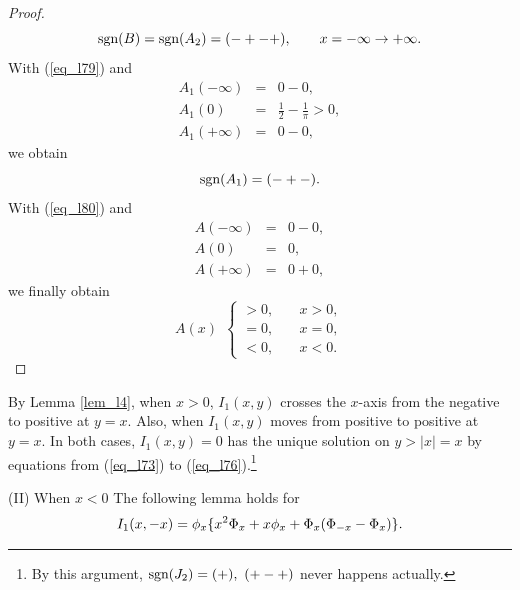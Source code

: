 \begin{proof}
\begin{equation}\label{eq_l79}
  \mbox{sgn}(B) = \mbox{sgn}(A_2) = (-+-+), \qquad x = -\infty \rightarrow +\infty.
\end{equation}
With (\ref{eq_l79}) and
\begin{eqnarray*}
  A_1(-\infty) & = & 0-0, \\
  A_1(0) & = & \frac{1}{2} - \frac{1}{\pi} > 0, \\
  A_1(+\infty) & = & 0-0,
\end{eqnarray*}
we obtain
\begin{equation}\label{eq_l80}
  \mbox{sgn}(A_1) = (-+-).
\end{equation}
With (\ref{eq_l80}) and
\begin{eqnarray*}
  A(-\infty) & = & 0-0, \\
  A(0) & = & 0, \\
  A(+\infty) & = & 0+0,
\end{eqnarray*}
we finally obtain
\[ %
  A(x) \ \ \left\{
  \begin{array}{ll}
   > 0, \quad & x>0, \\
   = 0, & x=0, \\
   < 0, & x<0.
  \end{array}
  \right.
\] %
\end{proof}

By Lemma \ref{lem_l4}, when $x>0$, $I_1(x,y)$ crosses the $x$-axis from the negative to positive at $y=x$.  Also, when $I_1(x,y)$ moves from positive to positive at $y=x$.  In both cases, $I_1(x,y)=0$ has the unique solution on $y>|x|=x$ by equations from (\ref{eq_l73}) to (\ref{eq_l76}).\footnote{By this argument, $\mbox{sgn}(J_2)=(+),\ (+-+)$ never happens actually.}

\bigskip

\noindent (II) When $x<0$
The following lemma holds for
\[
 I_1(x,-x) = \phi_x \{ x^2 \Phi_x + x \phi_x + \Phi_x (\Phi_{-x} - \Phi_x) \}.
\]

